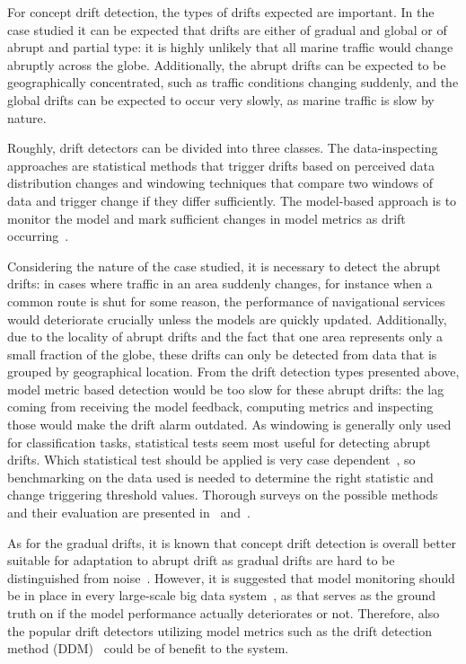 For concept drift detection, the types of drifts expected are important. In the case studied it can be expected that drifts are either of gradual and global or of abrupt and partial type: it is highly unlikely that all marine traffic would change abruptly across the globe. Additionally, the abrupt drifts can be expected to be geographically concentrated, such as traffic conditions changing suddenly, and the global drifts can be expected to occur very slowly, as marine traffic is slow by nature.

Roughly, drift detectors can be divided into three classes. The data-inspecting approaches are statistical methods that trigger drifts based on perceived data distribution changes and windowing techniques that compare two windows of data and trigger change if they differ sufficiently. The model-based approach is to monitor the model and mark sufficient changes in model metrics as drift occurring~\cite{faithfullUnsupervisedChangeDetection2018}.

Considering the nature of the case studied, it is necessary to detect the abrupt drifts: in cases where traffic in an area suddenly changes, for instance when a common route is shut for some reason, the performance of navigational services would deteriorate crucially unless the models are quickly updated. Additionally, due to the locality of abrupt drifts and the fact that one area represents only a small fraction of the globe, these drifts can only be detected from data that is grouped by geographical location. From the drift detection types presented above, model metric based detection would be too slow for these abrupt drifts: the lag coming from receiving the model feedback, computing metrics and inspecting those would make the drift alarm outdated. As windowing is generally only used for classification tasks, statistical tests seem most useful for detecting abrupt drifts. Which statistical test should be applied is very case dependent~\cite{faithfullUnsupervisedChangeDetection2018}, so benchmarking on the data used is needed to determine the right statistic and change triggering threshold values. Thorough surveys on the possible methods and their evaluation are presented in~\cite{conceptdriftsurvey} and~\cite{faithfullUnsupervisedChangeDetection2018}.

As for the gradual drifts, it is known that concept drift detection is overall better suitable for adaptation to abrupt drift as gradual drifts are hard to be distinguished from noise~\cite{zliobaiteLearningConceptDrift2010}. However, it is suggested that model monitoring should be in place in every large-scale big data system~\cite{googlemlops}, as that serves as the ground truth on if the model performance actually deteriorates or not. Therefore, also the popular drift detectors utilizing model metrics such as the drift detection method (DDM)~\cite{gamaLearningDriftDetection2004} could be of benefit to the system.

